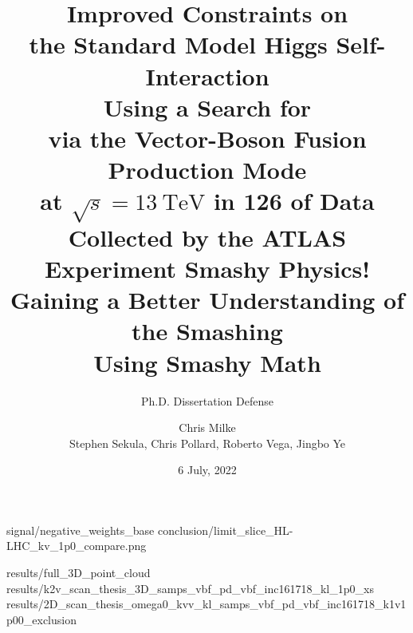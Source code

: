 \documentclass{beamer}
\begin{document}
\title{
    Improved Constraints on \\the Standard Model Higgs Self-Interaction \\
    Using a Search for \hhbbbb \\via the Vector-Boson Fusion Production Mode \\
    at $\sqrt{s}=13~\mathrm{TeV}$ in 126 \ifb of Data \\Collected by the ATLAS Experiment
}
\subtitle{\vspace{3mm}Ph.D. Dissertation Defense}

\author{Chris Milke\\{\small Stephen Sekula, Chris Pollard, Roberto Vega, Jingbo Ye}}
\date{6 July, 2022}

\frame{\titlepage}
\title{
    Smashy Physics!\\Gaining a Better Understanding of the Smashing\\Using Smashy Math
}
\frame{\titlepage}





{signal/negative_weights_base}
{conclusion/limit_slice_HL-LHC_kv_1p0_compare.png}

{results/full_3D_point_cloud}
{results/k2v_scan_thesis_3D_samps_vbf_pd_vbf_inc161718_kl_1p0_xs}
{results/2D_scan_thesis_omega0_kvv_kl_samps_vbf_pd_vbf_inc161718_k1v1p00_exclusion}


%
%
%
%
\end{document}
